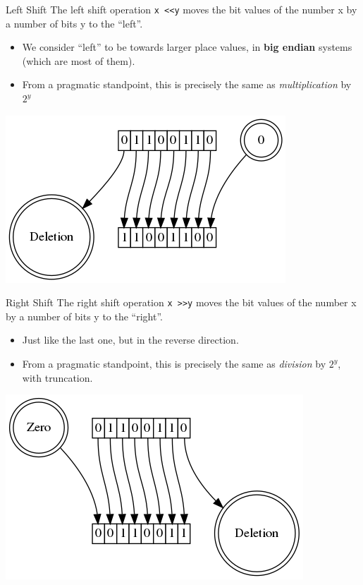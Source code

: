 \documentclass[11pt]{beamer}
\begin{document}
\begin{frame}{Left Shift}
The left shift operation \texttt{x \textless\textless y} moves the bit values of the number x by a number of bits y to the ``left''.  
\begin{itemize}
\item We consider ``left'' to be towards larger place values, in \textbf{big endian} systems (which are most of them).
\item From a pragmatic standpoint, this is precisely the same as \emph{multiplication} by $2^{y}$  
\end{itemize}
\center 
\includegraphics[scale=0.35]{ls.png}
\end{frame}

\begin{frame}{Right Shift}
The right shift operation \texttt{x \textgreater\textgreater y} moves the bit values of the number x by a number of bits y to the ``right''.  
\begin{itemize}
\item Just like the last one, but in the reverse direction.  
\item From a pragmatic standpoint, this is precisely the same as \emph{division} by $2^{y}$, with truncation.
\end{itemize}
\center 
\includegraphics[scale=0.35]{rs.png}
\end{frame}
\end{document}
